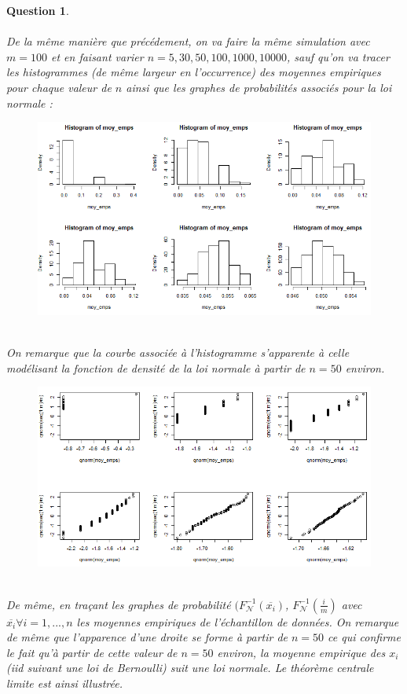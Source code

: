 \documentclass[a4paper,11pt]{article}
\newtheorem{exo4}{Question}
\begin{document}
\begin{exo4} \ \\ \\
De la même manière que précédement, on va faire la même simulation avec $m=100$ et en faisant varier $n=5,30,50,100,1000,10000$, sauf qu'on va tracer les histogrammes (de même largeur en l'occurrence) des moyennes empiriques pour chaque valeur de $n$ ainsi que les graphes de probabilités associés pour la loi normale :
\newpage
\begin{figure}[h]
\includegraphics[scale=1]{images/Q4_3_histo.PNG}
\end{figure} \ \\
On remarque que la courbe associée à l'histogramme s'apparente à celle modélisant la fonction de densité de la loi normale à partir de $n=50$ environ.
\begin{figure}[h]
\includegraphics[scale=1]{images/Q4_3_proba.PNG}
\end{figure} \ \\
De même, en traçant les graphes de probabilité $(F_{\mathscr{N}}^{-1}(\overline{x_{i}})$, $F_{\mathscr{N}}^{-1}(\frac{i}{m})$ avec $\overline{x_{i}} \forall i=1,...,n$ les moyennes empiriques de l'échantillon de données. On remarque de même que l'apparence d'une droite se forme à partir de $n=50$ ce qui confirme le fait qu'à partir de cette valeur de $n=50$ environ, la moyenne empirique des $x_{i}$ (iid suivant une loi de Bernoulli) suit une loi normale. Le théorème centrale limite est ainsi illustrée.
\end{exo4}
\end{document}
